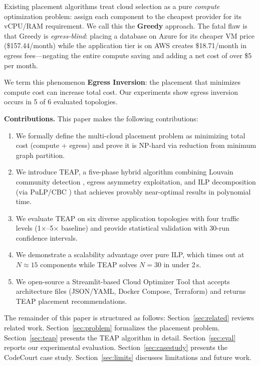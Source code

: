 \documentclass[10pt,journal,compsoc]{IEEEtran}
\begin{document}
Existing placement algorithms treat cloud selection as a pure \emph{compute}
optimization problem: assign each component to the cheapest provider for its
vCPU/RAM requirement.
We call this the \textbf{Greedy} approach.
The fatal flaw is that Greedy is \emph{egress-blind}: placing a database
on Azure for its cheaper VM price (\$157.44/month) while the application
tier is on AWS creates \$18.71/month in egress fees—negating the entire
compute saving and adding a net cost of over \$5 per month.

We term this phenomenon \textbf{Egress Inversion}: the placement that
minimizes compute cost can increase total cost.
Our experiments show egress inversion occurs in 5 of 6 evaluated topologies.

\textbf{Contributions.} This paper makes the following contributions:
\begin{enumerate}
  \item We formally define the multi-cloud placement problem as minimizing
        total cost (compute + egress) and prove it is NP-hard via reduction
        from minimum graph partition.
  \item We introduce TEAP, a five-phase hybrid algorithm combining
        Louvain community detection \cite{blondel2008}, egress asymmetry
        exploitation, and ILP decomposition (via PuLP/CBC \cite{pulp}) that
        achieves provably near-optimal results in polynomial time.
  \item We evaluate TEAP on six diverse application topologies with four
        traffic levels (1$\times$–5$\times$ baseline) and provide
        statistical validation with 30-run confidence intervals.
  \item We demonstrate a scalability advantage over pure ILP, which times
        out at $N \approx 15$ components while TEAP solves $N = 30$ in
        under 2\,s.
  \item We open-source a Streamlit-based Cloud Optimizer Tool that
        accepts architecture files (JSON/YAML, Docker Compose, Terraform)
        and returns TEAP placement recommendations.
\end{enumerate}

The remainder of this paper is structured as follows:
Section~\ref{sec:related} reviews related work.
Section~\ref{sec:problem} formalizes the placement problem.
Section~\ref{sec:teap} presents the TEAP algorithm in detail.
Section~\ref{sec:eval} reports our experimental evaluation.
Section~\ref{sec:casestudy} presents the CodeCourt case study.
Section~\ref{sec:limits} discusses limitations and future work.
\end{document}
